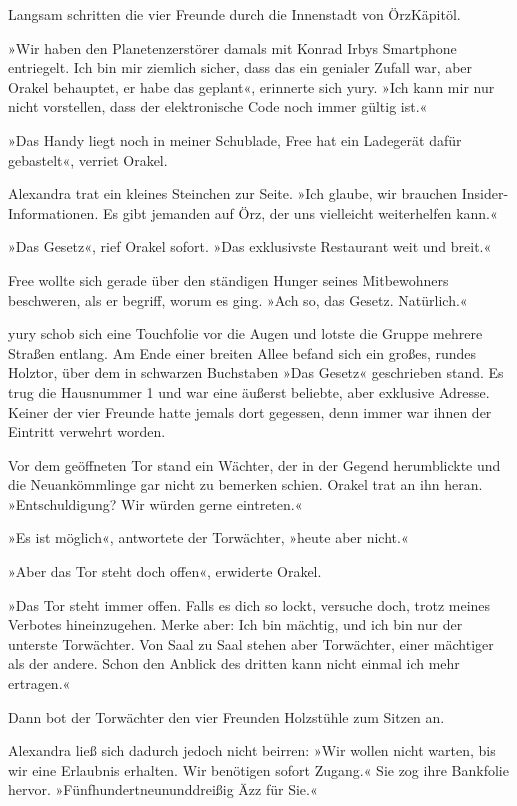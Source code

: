 Langsam schritten die vier Freunde durch die Innenstadt von ÖrzKäpitöl.

»Wir haben den Planetenzerstörer damals mit Konrad Irbys Smartphone entriegelt. Ich bin mir ziemlich sicher, dass das ein genialer Zufall war, aber Orakel behauptet, er habe das geplant«, erinnerte sich yury. »Ich kann mir nur nicht vorstellen, dass der elektronische Code noch immer gültig ist.«

»Das Handy liegt noch in meiner Schublade, Free hat ein Ladegerät dafür gebastelt«, verriet Orakel.

Alexandra trat ein kleines Steinchen zur Seite. »Ich glaube, wir brauchen Insider-Informationen. Es gibt jemanden auf Örz, der uns vielleicht weiterhelfen kann.«

»Das Gesetz«, rief Orakel sofort. »Das exklusivste Restaurant weit und breit.«

Free wollte sich gerade über den ständigen Hunger seines Mitbewohners beschweren, als er begriff, worum es ging. »Ach so, das Gesetz. Natürlich.«

yury schob sich eine Touchfolie vor die Augen und lotste die Gruppe mehrere Straßen entlang. Am Ende einer breiten Allee befand sich ein großes, rundes Holztor, über dem in schwarzen Buchstaben »Das Gesetz« geschrieben stand. Es trug die Hausnummer 1 und war eine äußerst beliebte, aber exklusive Adresse. Keiner der vier Freunde hatte jemals dort gegessen, denn immer war ihnen der Eintritt verwehrt worden.

Vor dem geöffneten Tor stand ein Wächter, der in der Gegend herumblickte und die Neuankömmlinge gar nicht zu bemerken schien. Orakel trat an ihn heran. »Entschuldigung? Wir würden gerne eintreten.«

»Es ist möglich«, antwortete der Torwächter, »heute aber nicht.«

»Aber das Tor steht doch offen«, erwiderte Orakel.

»Das Tor steht immer offen. Falls es dich so lockt, versuche doch, trotz meines Verbotes hineinzugehen. Merke aber: Ich bin mächtig, und ich bin nur der unterste Torwächter. Von Saal zu Saal stehen aber Torwächter, einer mächtiger als der andere. Schon den Anblick des dritten kann nicht einmal ich mehr ertragen.«

Dann bot der Torwächter den vier Freunden Holzstühle zum Sitzen an.

Alexandra ließ sich dadurch jedoch nicht beirren: »Wir wollen nicht warten, bis wir eine Erlaubnis erhalten. Wir benötigen sofort Zugang.« Sie zog ihre Bankfolie hervor. »Fünfhundertneununddreißig Äzz für Sie.«

